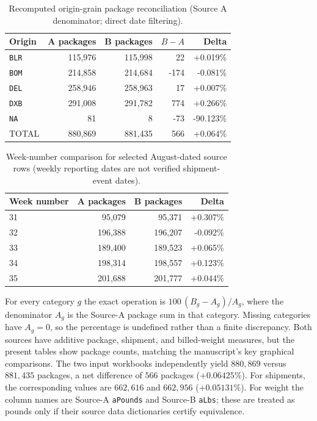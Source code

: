 \documentclass[11pt]{article}
\begin{document}
\begin{table}[htbp]\centering\scriptsize
\caption{Recomputed origin-grain package reconciliation (Source A denominator; direct date filtering).}\label{tab:verified-by_ramp}
\begin{tabular}{lrrrr}\toprule
Origin & A packages & B packages & $B-A$ & Delta \\
\midrule
\texttt{BLR} & 115,976 & 115,998 & 22 & +0.019\% \\
\texttt{BOM} & 214,858 & 214,684 & -174 & -0.081\% \\
\texttt{DEL} & 258,946 & 258,963 & 17 & +0.007\% \\
\texttt{DXB} & 291,008 & 291,782 & 774 & +0.266\% \\
\texttt{NA} & 81 & 8 & -73 & -90.123\% \\
TOTAL & 880,869 & 881,435 & 566 & +0.064\% \\
\bottomrule\end{tabular}\end{table}

\begin{table}[htbp]\centering\scriptsize
\caption{Week-number comparison for selected August-dated source rows (weekly reporting dates are not verified shipment-event dates).}\label{tab:verified-week}
\begin{tabular}{lrrr}\toprule
Week number & A packages & B packages & Delta \\
\midrule
31 & 95,079 & 95,371 & +0.307\% \\
32 & 196,388 & 196,207 & -0.092\% \\
33 & 189,400 & 189,523 & +0.065\% \\
34 & 198,314 & 198,557 & +0.123\% \\
35 & 201,688 & 201,777 & +0.044\% \\
\bottomrule\end{tabular}\end{table}

For every category $g$ the exact operation is $100\,(B_g-A_g)/A_g$, where the denominator $A_g$ is the Source-A package sum in that category. Missing categories have $A_g=0$, so the percentage is undefined rather than a finite discrepancy. Both sources have additive package, shipment, and billed-weight measures, but the present tables show package counts, matching the manuscript's key graphical comparisons. The two input workbooks independently yield $880{,}869$ versus $881{,}435$ packages, a net difference of $566$ packages ($+0.06425\%$). For shipments, the corresponding values are $662{,}616$ and $662{,}956$ ($+0.05131\%$). For weight the column names are Source-A \texttt{aPounds} and Source-B \texttt{aLbs}; these are treated as pounds only if their source data dictionaries certify equivalence.
\end{document}
